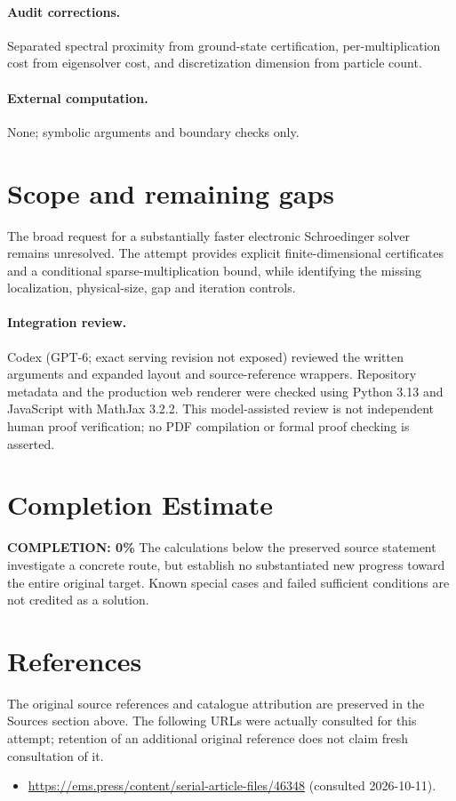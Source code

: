 \documentclass[11pt]{article}
\begin{document}
\paragraph{Audit corrections.} Separated spectral proximity from ground-state certification, per-multiplication cost from eigensolver cost, and discretization dimension from particle count.
\paragraph{External computation.} None; symbolic arguments and boundary checks only.
\section{Scope and remaining gaps}
The broad request for a substantially faster electronic Schroedinger solver remains unresolved. The attempt provides explicit finite-dimensional certificates and a conditional sparse-multiplication bound, while identifying the missing localization, physical-size, gap and iteration controls.
\paragraph{Integration review.} Codex (GPT-6; exact serving revision not exposed) reviewed the written arguments and expanded layout and source-reference wrappers. Repository metadata and the production web renderer were checked using Python 3.13 and JavaScript with MathJax 3.2.2. This model-assisted review is not independent human proof verification; no PDF compilation or formal proof checking is asserted.

\section{Completion Estimate}
\noindent\textbf{COMPLETION: 0\%}
The calculations below the preserved source statement investigate a concrete route,
but establish no substantiated new progress toward the entire original target.
Known special cases and failed sufficient conditions are not credited as a solution.
\section{References}
The original source references and catalogue attribution are preserved in the
Sources section above. The following URLs were actually consulted for this attempt;
retention of an additional original reference does not claim fresh consultation of it.
\begin{itemize}
\item \url{https://ems.press/content/serial-article-files/46348} (consulted 2026-10-11). 
\end{itemize}
\end{document}
